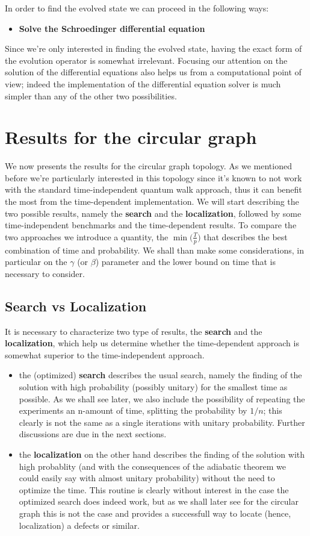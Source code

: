\noindent
In order to find the evolved state we can proceed in the following ways:
\begin{itemize}
  \item \textbf{Solve the Schroedinger differential equation}
\end{itemize}
Since we're only interested in finding the evolved state, having the exact form of the evolution operator is somewhat irrelevant. Focusing our attention on the solution of the differential equations also helps us from a computational point of view; indeed the implementation of the differential equation solver is much simpler than any of the other two possibilities.


\section{Results for the circular graph}
We now presents the results for the circular graph topology. As we mentioned before we're particularly interested in this topology since it's known to not work with the standard time-independent quantum walk approach, thus it can benefit the most from the time-dependent implementation. We will start describing the two possible results, namely the \textbf{search} and the \textbf{localization}, followed by some time-independent benchmarks and the time-dependent results. To compare the two approaches we introduce a quantity, the $\min\Big(\frac{T}{p}\Big)$ that describes the best combination of time and probability. We shall than make some considerations, in particular on the $\gamma$ (or $\beta$) parameter and the lower bound on time that is necessary to consider.

\subsection{Search vs Localization}
It is necessary to characterize two type of results, the \textbf{search} and the \textbf{localization}, which help us determine whether the time-dependent approach is somewhat superior to the time-independent approach.
  \begin{itemize}
    \item the (optimized) \textbf{search} describes the usual search, namely the finding of the solution with high probability (possibly unitary) for the smallest time as possible. As we shall see later, we also include the possibility of repeating the experiments an n-amount of time, splitting the probability by $1/n$; this clearly is not the same as a single iterations with unitary probability. Further discussions are due in the next sections.
    \item the \textbf{localization} on the other hand describes the finding of the solution with high probablity (and with the consequences of the adiabatic theorem we could easily say with almost unitary probability) without the need to optimize the time. This routine is clearly without interest in the case the optimized search does indeed work, but as we shall later see for the circular graph this is not the case and provides a successfull way to locate (hence, localization) a defects or similar.
  \end{itemize}

